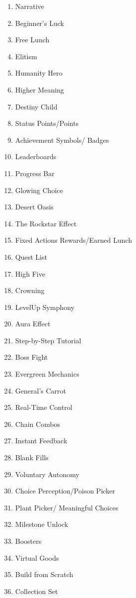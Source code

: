 \begin{multicols}{2}
    \begin{enumerate}
        \item Narrative
        \item Beginner's Luck
        \item Free Lunch
        \item Elitism
        \item Humanity Hero
        \item Higher Meaning
        \item Destiny Child
        \item Status Points/Points
        \item Achievement Symbols/ Badges
        \item Leaderboards
        \item Progress Bar
        \item Glowing Choice
        \item Desert Oasis
        \item The Rockstar Effect
        \item Fixed Actions Rewards/Earned Lunch
        \item Quest List
        \item High Five
        \item Crowning
        \item LevelUp Symphony
        \item Aura Effect
        \item Step-by-Step Tutorial
        \item Boss Fight
        \item Evergreen Mechanics
        \item General's Carrot
        \item Real-Time Control
        \item Chain Combos
        \item Instant Feedback
        \item Blank Fills
        \item Voluntary Autonomy
        \item Choice Perception/Poison Picker
        \item Plant Picker/ Meaningful Choices
        \item Milestone Unlock
        \item Boosters
        \item Virtual Goods
        \item Build from Scratch
        \item Collection Set

\end{enumerate}
\end{multicols}
